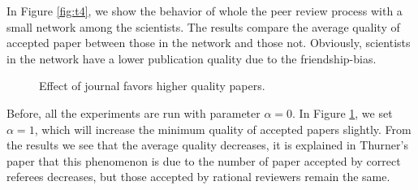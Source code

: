 \documentclass[11pt]{article}
\begin{document}
In Figure \ref{fig:t4}, we show the behavior of whole the peer review process with a small network among the scientists. The results compare the average quality of accepted paper between those in the network and those not. Obviously, scientists in the network have a lower publication quality due to the friendship-bias.

\begin{figure}[H]
    \begin{center}
    \caption{Effect of journal favors higher quality papers.}
    \label{fig:t5}
    \end{center}
\end{figure}

Before, all the experiments are run with parameter $\alpha = 0$. In Figure \ref{fig:t5}, we set $\alpha = 1$, which will increase the minimum quality of accepted papers slightly. From the results we see that the average quality decreases, it is explained in Thurner's paper that this phenomenon is due to the number of paper accepted by correct referees decreases, but those accepted by rational reviewers remain the same.
\end{document}
